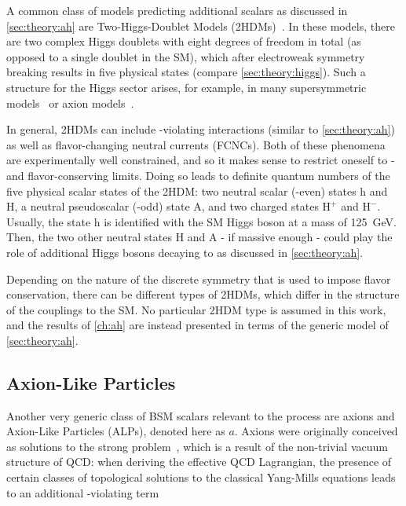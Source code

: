 A common class of models predicting additional scalars as discussed in \cref{sec:theory:ah} are Two-Higgs-Doublet Models (2HDMs)~\cite{Lee:1973iz,Branco:2011iw}. In these models, there are two complex Higgs doublets with eight degrees of freedom in total (as opposed to a single doublet in the SM), which after electroweak symmetry breaking results in five physical states (compare \cref{sec:theory:higgs}). Such a structure for the Higgs sector arises, for example, in many supersymmetric models~\cite{Haber:1984rc} or axion models~\cite{Kim:1986ax}.

In general, 2HDMs can include \CP-violating interactions (similar to \cref{sec:theory:ah}) as well as flavor-changing neutral currents (FCNCs). Both of these phenomena are experimentally well constrained, and so it makes sense to restrict oneself to \CP- and flavor-conserving limits. Doing so leads to definite quantum numbers of the five physical scalar states of the 2HDM: two neutral scalar (\CP-even) states h and H, a neutral pseudoscalar (\CP-odd) state A, and two charged states $\mathrm{H}^+$ and $\mathrm{H}^-$. Usually, the state h is identified with the SM Higgs boson at a mass of \SI{125}{\GeV}. Then, the two other neutral states H and A - if massive enough - could play the role of additional Higgs bosons decaying to \ttbar as discussed in \cref{sec:theory:ah}.

Depending on the nature of the discrete symmetry that is used to impose flavor conservation, there can be different types of 2HDMs, which differ in the structure of the couplings to the SM. No particular 2HDM type is assumed in this work, and the results of \cref{ch:ah} are instead presented in terms of the generic model of \cref{sec:theory:ah}.

\subsection{Axion-Like Particles}
\label{sec:theory:alps}

Another very generic class of BSM scalars relevant to the \pptt process are axions and Axion-Like Particles (ALPs), denoted here as $a$. 
Axions were originally conceived as solutions to the strong \CP problem~\cite{Peccei:1977hh,Peccei:1977ur,Weinberg:1977ma,Wilczek:1977pj}, which is a result of the non-trivial vacuum structure of QCD: when deriving the effective QCD Lagrangian, the presence of certain classes of topological solutions to the classical Yang-Mills equations leads to an additional \CP-violating term~\cite{DiLuzio:2020wdo}

